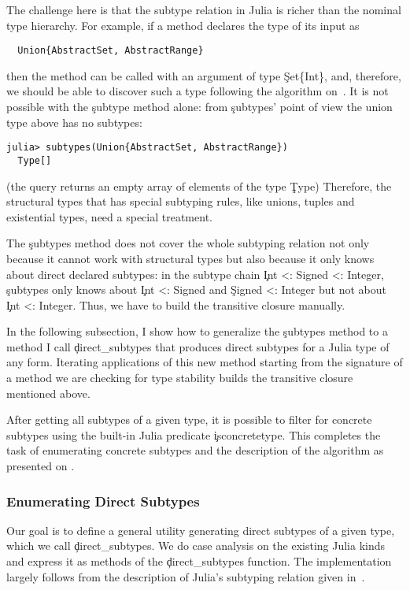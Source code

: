 The challenge here is that the subtype relation in Julia is richer than the
nominal type hierarchy. For example, if a method declares the type of its input
as
\begin{lstlisting}
  Union{AbstractSet, AbstractRange}
\end{lstlisting}
then the method can be called with an argument of type \c{Set\{Int\}}, and,
therefore, we should be able to discover such a type following the algorithm
on~. It is not possible with the \c{subtype} method alone:
from \c{subtypes}' point of view the union type above has no subtypes:
\begin{lstlisting}[style=jterm]
  julia> subtypes(Union{AbstractSet, AbstractRange})
  Type[]
\end{lstlisting}
(the query returns an empty array of elements of the type \c{Type})
Therefore, the structural types that has special subtyping rules, like unions,
tuples and existential types, need a special treatment.

The \c{subtypes} method does not cover the whole subtyping relation not only
because it cannot work with structural types but also because it only knows
about direct declared subtypes: in the subtype chain
\c{Int <: Signed <: Integer}, \c{subtypes} only knows about \c{Int <: Signed}
and \c{Signed <: Integer} but not about \c{Int <: Integer}. Thus, we have to build
the transitive closure manually.

In the following subsection, I show how to generalize the \c{subtypes} method to a
method I call \c{direct_subtypes} that produces direct subtypes for a Julia type
of any form. Iterating applications of this new method starting from the
signature of a method we are checking for type stability builds the transitive
closure mentioned above.

After getting all subtypes of a given type, it is possible to filter for concrete
subtypes using the built-in Julia predicate \c{isconcretetype}. This completes
the task of enumerating concrete subtypes and the description of the algorithm
as presented on .


\subsubsection{Enumerating Direct Subtypes}

Our goal is to define a general utility generating direct subtypes of a given
type, which we call \c{direct_subtypes}.
We do case analysis on the existing Julia kinds and express it as methods
of the \c{direct_subtypes} function. The implementation largely follows from the
description of Julia's subtyping relation given in~\cite{oopsla18b}.

